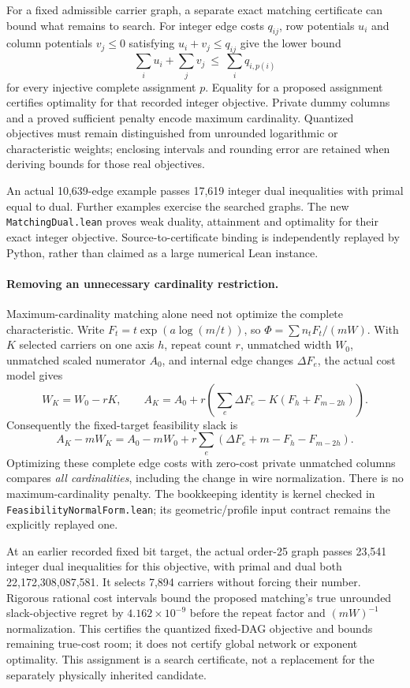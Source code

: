 \documentclass[11pt]{article}
\begin{document}
For a fixed admissible carrier graph, a separate exact matching certificate
can bound what remains to search. For integer edge costs $q_{ij}$, row
potentials $u_i$ and column potentials $v_j\le0$ satisfying
$u_i+v_j\le q_{ij}$ give the lower bound
\[
 \sum_i u_i+\sum_j v_j\ \le\ \sum_i q_{i,p(i)}
\]
for every injective complete assignment $p$. Equality for a proposed
assignment certifies optimality for that recorded integer objective.
Private dummy columns and a proved sufficient penalty encode maximum
cardinality. Quantized objectives must remain distinguished from
unrounded logarithmic or characteristic weights; enclosing intervals and
rounding error are retained when deriving bounds for those real objectives.

An actual 10,639-edge example passes 17,619 integer dual inequalities with
primal equal to dual. Further examples exercise the searched graphs.
The new \texttt{MatchingDual.lean} proves weak duality, attainment and
optimality for their exact integer objective. Source-to-certificate binding
is independently replayed by Python, rather than claimed as a large
numerical Lean instance.

\paragraph{Removing an unnecessary cardinality restriction.}
Maximum-cardinality matching alone need not optimize the complete
characteristic. Write $F_t=t\exp(a\log(m/t))$, so
$\Phi=\sum n_tF_t/(mW)$. With $K$ selected carriers on one axis $h$,
repeat count $r$, unmatched width $W_0$, unmatched scaled numerator $A_0$,
and internal edge changes $\Delta F_e$, the actual cost model gives
\[
 W_K=W_0-rK,\qquad
 A_K=A_0+r\left(\sum_e\Delta F_e-K(F_h+F_{m-2h})\right).
\]
Consequently the fixed-target feasibility slack is
\begin{equation}\label{eq:allcard}
 A_K-mW_K=A_0-mW_0+
 r\sum_e\left(\Delta F_e+m-F_h-F_{m-2h}\right).
\end{equation}
Optimizing these complete edge costs with zero-cost private unmatched
columns compares \emph{all cardinalities}, including the change in wire
normalization. There is no maximum-cardinality penalty. The bookkeeping
identity is kernel checked in \texttt{FeasibilityNormalForm.lean}; its
geometric/profile input contract remains the explicitly replayed one.

At an earlier recorded fixed bit target, the actual order-25 graph passes 23,541
integer dual inequalities for this objective, with primal and dual both
22,172,308,087,581. It selects 7,894 carriers without forcing their number.
Rigorous rational cost intervals bound the proposed matching's true
unrounded slack-objective regret by $4.162\times10^{-9}$ before the repeat
factor and $(mW)^{-1}$ normalization. This certifies the quantized fixed-DAG
objective and bounds remaining true-cost room; it does not certify global
network or exponent optimality. This assignment is a search certificate,
not a replacement for the separately physically inherited candidate.
\end{document}
